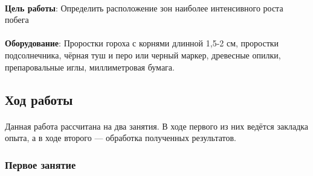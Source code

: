 


\paragraph*{}\textbf{Цель работы}: Определить расположение зон наиболее интенсивного роста побега

\paragraph*{}\textbf{Оборудование}: Проростки гороха с корнями длинной 1,5-2 см, проростки подсолнечника, чёрная туш и перо или черный маркер, древесные опилки, препаровальные иглы, миллиметровая бумага.

\subsection*{Ход работы}

\paragraph*{}Данная работа рассчитана на два занятия. В ходе первого из них ведётся закладка опыта, а в ходе второго — обработка полученных результатов.

	\subsubsection*{Первое занятие}
	
